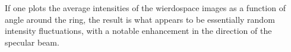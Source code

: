 If one plots the average intensities of the wierdospace images as a
function of angle around the ring, the result is what appears to be
essentially random intensity fluctuations, with a notable enhancement in
the direction of the specular beam.  

